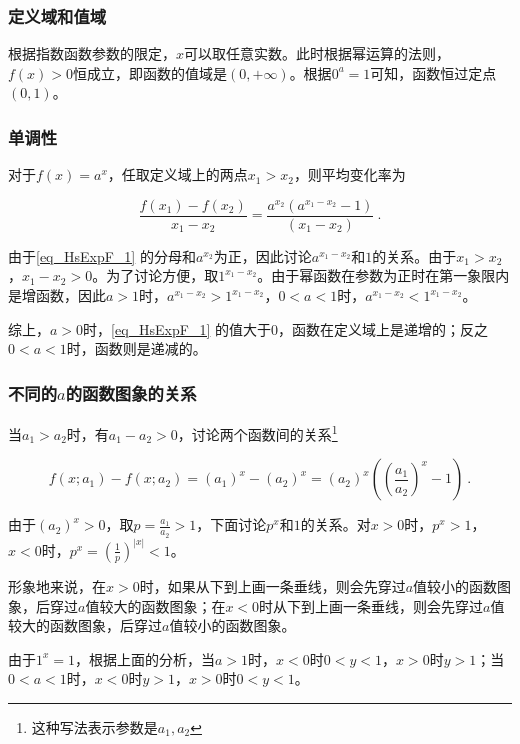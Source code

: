 \subsubsection{定义域和值域}

根据指数函数参数的限定，$x$可以取任意实数。此时根据幂运算的法则，$f(x)>0$恒成立，即函数的值域是$(0,+\infty)$。根据$0^a=1$可知，函数恒过定点$(0,1)$。

\subsubsection{单调性}

对于$f(x)=a^x$，任取定义域上的两点$x_1>x_2$，则平均变化率为

\begin{equation}\label{eq_HsExpF_1}
\frac{f(x_1)-f(x_2)}{x_1-x_2}=\frac{a^{x_2}(a^{x_1-x_2}-1)}{(x_1-x_2)}~.
\end{equation}

由于\autoref{eq_HsExpF_1} 的分母和$a^{x_2}$为正，因此讨论$a^{x_1-x_2}$和$1$的关系。由于$x_1>x_2$，$x_1-x_2>0$。为了讨论方便，取$1^{x_1-x_2}$。由于幂函数在参数为正时在第一象限内是增函数，因此$a>1$时，$a^{x_1-x_2}>1^{x_1-x_2}$，$0<a<1$时，$a^{x_1-x_2}<1^{x_1-x_2}$。

综上，$a>0$时，\autoref{eq_HsExpF_1} 的值大于$0$，函数在定义域上是递增的；反之$0<a<1$时，函数则是递减的。

\subsubsection{不同的$a$的函数图象的关系}

当$a_1>a_2$时，有$a_1-a_2>0$，讨论两个函数间的关系\footnote{这种写法表示参数是$a_1,a_2$}

\begin{equation}
f(x;a_1)-f(x;a_2)=(a_1)^x-(a_2)^x=(a_2)^x\left(\left(\frac{a_1}{a_2}\right)^x-1\right)~.
\end{equation}

由于$\displaystyle (a_2)^x>0$，取$p=\frac{a_1}{a_2}>1$，下面讨论$p^x$和$1$的关系。对$x>0$时，$p^x>1$，$x<0$时，$\displaystyle p^x=\left(\frac{1}{p}\right)^{|x|}<1$。

形象地来说，在$x>0$时，如果从下到上画一条垂线，则会先穿过$a$值较小的函数图象，后穿过$a$值较大的函数图象；在$x<0$时从下到上画一条垂线，则会先穿过$a$值较大的函数图象，后穿过$a$值较小的函数图象。

由于$1^x=1$，根据上面的分析，当$a>1$时，$x<0$时$0<y<1$，$x>0$时$y>1$；当$0<a<1$时，$x<0$时$y>1$，$x>0$时$0<y<1$。

